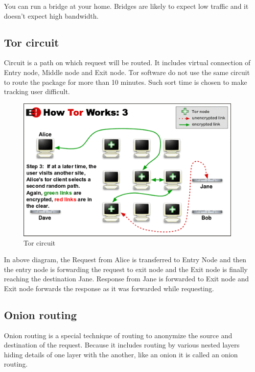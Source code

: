 \documentclass{article}
\begin{document}
      You can run a bridge at your home. Bridges are likely to expect low
      traffic and it doesn't expect high bandwidth.

    \subsection{Tor circuit}
      Circuit is a path on which request will be routed. It includes virtual
      connection of Entry node, Middle node and Exit node. Tor software do not
      use the same circuit to route the package for more than 10 minutes. Such
      sort time is chosen to make tracking user difficult.

      \begin{figure}[h!]
        \includegraphics[width=\linewidth]{tor_circuit.png}
        \caption{Tor circuit}
        \label{fig:tor_circuit}
      \end{figure}

      In above diagram, the Request from Alice is transferred to Entry Node and
      then the entry node is forwarding the request to exit node and the Exit
      node is finally reaching the destination Jane. Response from Jane is
      forwarded to Exit node and Exit node forwards the response as it was
      forwarded while requesting.

    \subsection{Onion routing}
      Onion routing is a special technique of routing to anonymize the source
      and destination of the request. Because it includes routing by various
      nested layers hiding details of one layer with the another, like an onion
      it is called an onion routing.
\end{document}
